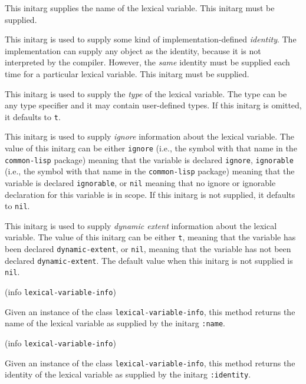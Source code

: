 
This initarg supplies the name of the lexical variable.  This initarg
must be supplied. 


This initarg is used to supply some kind of implementation-defined 
\emph{identity}.  The implementation can supply any object as the
identity, because it is not interpreted by the compiler.  However, the
\emph{same} identity must be supplied each time for a particular
lexical variable.  This initarg must be supplied. 


This initarg is used to supply the \emph{type} of the lexical
variable.  The type can be any type specifier and it may contain
user-defined types.  If this initarg is omitted, it defaults to
\texttt{t}. 


This initarg is used to supply \emph{ignore} information about the
lexical variable.  The value of this initarg can be either
\texttt{ignore} (i.e., the symbol with that name in the
\texttt{common-lisp} package) meaning that the variable is declared
\texttt{ignore}, \texttt{ignorable} (i.e., the symbol with that name
in the \texttt{common-lisp} package) meaning that the variable is
declared \texttt{ignorable}, or \texttt{nil} meaning that no ignore or
ignorable declaration for this variable is in scope.  If this initarg
is not supplied, it defaults to \texttt{nil}.


This initarg is used to supply \emph{dynamic extent} information about
the lexical variable.  The value of this initarg can be either
\texttt{t}, meaning that the variable has been declared
\texttt{dynamic-extent}, or \texttt{nil}, meaning that the variable
has not been declared \texttt{dynamic-extent}.  The default value when
this initarg is not supplied is \texttt{nil}. 

 {(info {\tt lexical-variable-info})}

Given an instance of the class \texttt{lexical-variable-info}, this
method returns the name of the lexical variable as supplied by the
initarg \texttt{:name}.

 {(info {\tt lexical-variable-info})}

Given an instance of the class \texttt{lexical-variable-info}, this
method returns the identity of the lexical variable as supplied by the
initarg \texttt{:identity}.


